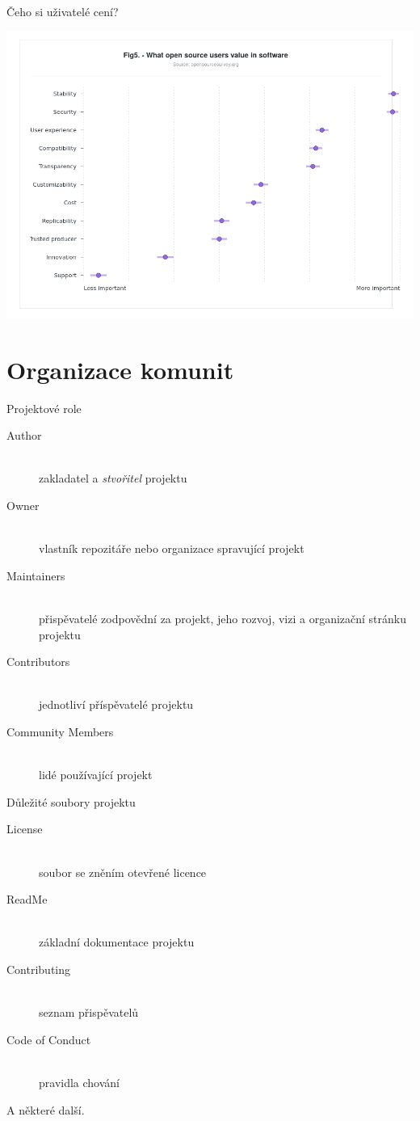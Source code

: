 \documentclass[11pt]{beamer}
\begin{document}
\begin{frame}{Čeho si uživatelé cení?}
	\begin{center}
		\includegraphics[width=\textwidth]{images/user_value.png}
	\end{center}
\end{frame}

\section{Organizace komunit}

\begin{frame}{Projektové role}	
	\begin{description}
		\item[Author] \hfill \\ zakladatel a \textit{stvořitel} projektu
		\item[Owner]  \hfill \\ vlastník repozitáře nebo organizace spravující projekt
		\item[Maintainers]  \hfill \\ přispěvatelé zodpovědní za projekt, jeho rozvoj, vizi a organizační stránku projektu
		\item[Contributors]  \hfill \\ jednotliví příspěvatelé projektu
		\item[Community Members]  \hfill \\ lidé používající projekt
	\end{description}
\end{frame}

\begin{frame}{Důležité soubory projektu}	
	\begin{description}
		\item[License] \hfill \\ soubor se zněním otevřené licence
		\item[ReadMe]  \hfill \\ základní dokumentace projektu
		\item[Contributing]  \hfill \\ seznam přispěvatelů
		\item[Code of Conduct]  \hfill \\ pravidla chování
	\end{description}
	A některé další. 
\end{frame}
\end{document}
